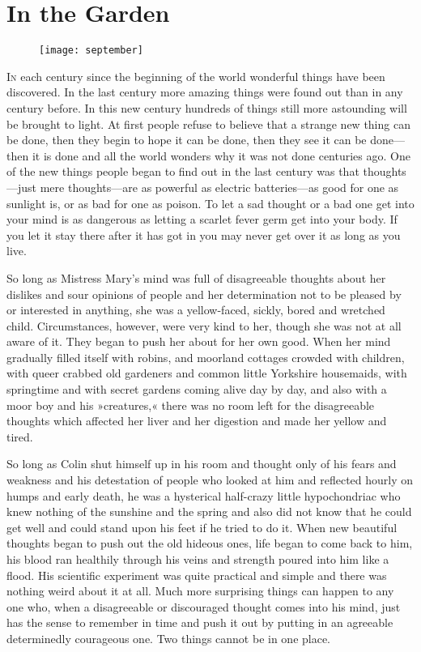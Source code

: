 \chapter{In the Garden} 
	
\begin{figure}[t!]
\centering
\texttt{[image: september]}
\end{figure}

 \lettrine[lines=6]{I}{n} each century since the beginning of the world wonderful things have been discovered. In the last century more amazing things were found out than in any century before. In this new century hundreds of things still more astounding will be brought to light. At first people refuse to believe that a strange new thing can be done, then they begin to hope it can be done, then they see it can be done—then it is done and all the world wonders why it was not done centuries ago. One of the new things people began to find out in the last century was that thoughts—just mere thoughts—are as powerful as electric batteries—as good for one as sunlight is, or as bad for one as poison. To let a sad thought or a bad one get into your mind is as dangerous as letting a scarlet fever germ get into your body. If you let it stay there after it has got in you may never get over it as long as you live.

So long as Mistress Mary's mind was full of disagreeable thoughts about her dislikes and sour opinions of people and her determination not to be pleased by or interested in anything, she was a yellow-faced, sickly, bored and wretched child. Circumstances, however, were very kind to her, though she was not at all aware of it. They began to push her about for her own good. When her mind gradually filled itself with robins, and moorland cottages crowded with children, with queer crabbed old gardeners and common little Yorkshire housemaids, with springtime and with secret gardens coming alive day by day, and also with a moor boy and his »creatures,« there was no room left for the disagreeable thoughts which affected her liver and her digestion and made her yellow and tired.

So long as Colin shut himself up in his room and thought only of his fears and weakness and his detestation of people who looked at him and reflected hourly on humps and early death, he was a hysterical half-crazy little hypochondriac who knew nothing of the sunshine and the spring and also did not know that he could get well and could stand upon his feet if he tried to do it. When new beautiful thoughts began to push out the old hideous ones, life began to come back to him, his blood ran healthily through his veins and strength poured into him like a flood. His scientific experiment was quite practical and simple and there was nothing weird about it at all. Much more surprising things can happen to any one who, when a disagreeable or discouraged thought comes into his mind, just has the sense to remember in time and push it out by putting in an agreeable determinedly courageous one. Two things cannot be in one place.

